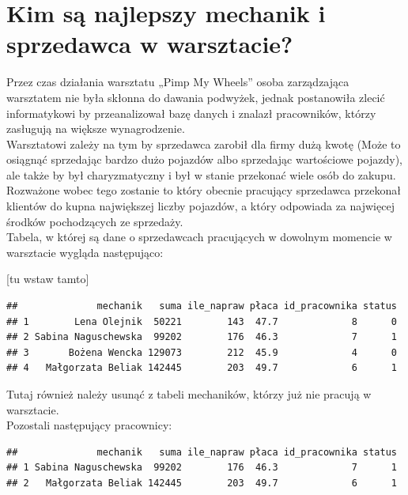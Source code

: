 \documentclass{article}\usepackage[]{graphicx}\usepackage[]{xcolor}
\makeatletter
\newenvironment{kframe}{%
 \def\at@end@of@kframe{}%
 \ifinner\ifhmode%
  \def\at@end@of@kframe{\end{minipage}}%
  \begin{minipage}{\columnwidth}%
 \fi\fi%
 \def\FrameCommand##1{\hskip\@totalleftmargin \hskip-\fboxsep
 \colorbox{shadecolor}{##1}\hskip-\fboxsep
     \hskip-\linewidth \hskip-\@totalleftmargin \hskip\columnwidth}%
 \MakeFramed {\advance\hsize-\width
   \@totalleftmargin\z@ \linewidth\hsize
   \@setminipage}}%
 {\par\unskip\endMakeFramed%
 \at@end@of@kframe}
\newenvironment{knitrout}{}{} %
\makeatother
\begin{document}
\section{Kim są najlepszy mechanik i sprzedawca w warsztacie?}

Przez czas działania warsztatu „Pimp My Wheels” osoba zarządzająca warsztatem nie była skłonna do dawania podwyżek, jednak postanowiła zlecić informatykowi by przeanalizował bazę danych i znalazł pracowników, którzy zasługują na większe wynagrodzenie. \\

Warsztatowi zależy na tym by sprzedawca zarobił dla firmy dużą kwotę (Może to osiągnąć sprzedając bardzo dużo pojazdów albo sprzedając wartościowe pojazdy), ale także by był charyzmatyczny i był w stanie przekonać wiele osób do zakupu. Rozważone wobec tego zostanie to który obecnie pracujący sprzedawca przekonał klientów do kupna największej liczby pojazdów, a który odpowiada za najwięcej środków pochodzących ze sprzedaży. \\


Tabela, w której są dane o sprzedawcach  pracujących w dowolnym momencie w warsztacie wygląda następująco:

{\color{red}[tu wstaw tamto]} 

\begin{knitrout}
\color{fgcolor}\begin{kframe}
\begin{verbatim}
##              mechanik   suma ile_napraw płaca id_pracownika status
## 1        Lena Olejnik  50221        143  47.7             8      0
## 2 Sabina Naguschewska  99202        176  46.3             7      1
## 3       Bożena Wencka 129073        212  45.9             4      0
## 4   Małgorzata Beliak 142445        203  49.7             6      1
\end{verbatim}
\end{kframe}
\end{knitrout}


Tutaj również należy usunąć z tabeli mechaników, którzy już nie pracują w warsztacie. \\

Pozostali następujący pracownicy:

\begin{knitrout}
\color{fgcolor}\begin{kframe}
\begin{verbatim}
##              mechanik   suma ile_napraw płaca id_pracownika status
## 1 Sabina Naguschewska  99202        176  46.3             7      1
## 2   Małgorzata Beliak 142445        203  49.7             6      1
\end{verbatim}
\end{kframe}
\end{knitrout}
\end{document}
